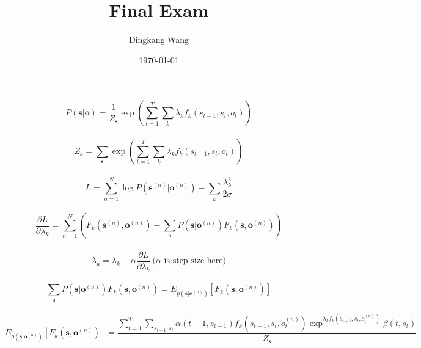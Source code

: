 \documentclass[11pt]{article}
\title {\vspace*{-2em}Final Exam}
\author{Dingkang Wang}
\date {\today}
\begin{document}
\maketitle

\begin{equation}
    P(\mathbf{s}|\mathbf{o}) = \frac{1}{Z_{\mathbf{s}}} \exp \left( \sum_{t=1}^{T} \sum_{k} \lambda_k f_k(s_{t-1}, s_t, o_t) \right)
\end{equation}
\\

\begin{equation}
    Z_{\mathbf{s}} = \sum_{\mathbf{s}} \exp \left( \sum_{t=1}^{T} \sum_{k} \lambda_k f_k(s_{t-1}, s_t, o_t) \right)
\end{equation}
\\

\begin{equation}
    L = \sum_{n=1}^{N} \log P( \mathbf{s}^{(n)} | \mathbf{o}^{(n)}) - \sum_{k} \frac{\lambda_k^2}{2\sigma}
\end{equation}
\\

\begin{equation}
    \frac{\partial L}{\partial \lambda_k} = \sum_{n=1}^{N} \left( F_k ( \mathbf{s}^{(n)}, \mathbf{o}^{(n)} ) - \sum_{\mathbf{s}} P( \mathbf{s} | \mathbf{o}^{(n)}) F_k ( \mathbf{s}, \mathbf{o}^{(n)} ) \right)
\end{equation}
\\

\begin{equation}
    \lambda_k = \lambda_k - \alpha \frac{\partial L}{\partial \lambda_k} \  \textrm{($\alpha$ is step size here)}
\end{equation}
\\

\begin{equation}
    \sum_{\mathbf{s}} P( \mathbf{s} | \mathbf{o}^{(n)}) F_k ( \mathbf{s}, \mathbf{o}^{(n)} ) = E_{p(\mathbf{s}|\mathbf{o}^{(n)})} [ F_k(\mathbf{s}, \mathbf{o}^{(n)}) ]
\end{equation}
\\

\begin{equation}
     E_{p(\mathbf{s}|\mathbf{o}^{(n)})} [ F_k(\mathbf{s}, \mathbf{o}^{(n)}) ] = \frac{\sum_{t=1}^{T} \sum_{s_{t-1}, s_t} \alpha(t-1, s_{t-1}) f_k(s_{t-1}, s_{t}, o^{(n)}_t) \exp^{\lambda_k f_k(s_{t-1}, s_{t}, o^{(n)}_t)} \beta(t, s_t)}{Z_{\mathbf{s}}}
\end{equation}
\\
\end{document}

